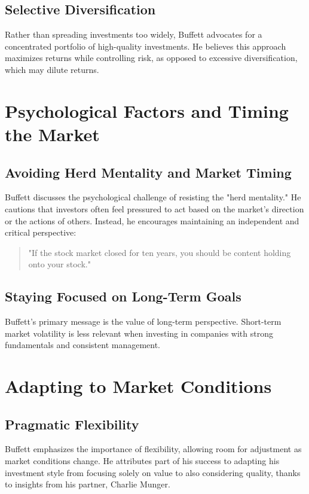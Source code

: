 \documentclass{article}
\begin{document}
\subsection*{Selective Diversification}
Rather than spreading investments too widely, Buffett advocates for a concentrated portfolio of high-quality investments. He believes this approach maximizes returns while controlling risk, as opposed to excessive diversification, which may dilute returns.

\section{Psychological Factors and Timing the Market}

\subsection*{Avoiding Herd Mentality and Market Timing}
Buffett discusses the psychological challenge of resisting the "herd mentality." He cautions that investors often feel pressured to act based on the market’s direction or the actions of others. Instead, he encourages maintaining an independent and critical perspective:
\begin{quote}
    "If the stock market closed for ten years, you should be content holding onto your stock."
\end{quote}

\subsection*{Staying Focused on Long-Term Goals}
Buffett’s primary message is the value of long-term perspective. Short-term market volatility is less relevant when investing in companies with strong fundamentals and consistent management.

\section{Adapting to Market Conditions}

\subsection*{Pragmatic Flexibility}
Buffett emphasizes the importance of flexibility, allowing room for adjustment as market conditions change. He attributes part of his success to adapting his investment style from focusing solely on value to also considering quality, thanks to insights from his partner, Charlie Munger.
\end{document}
